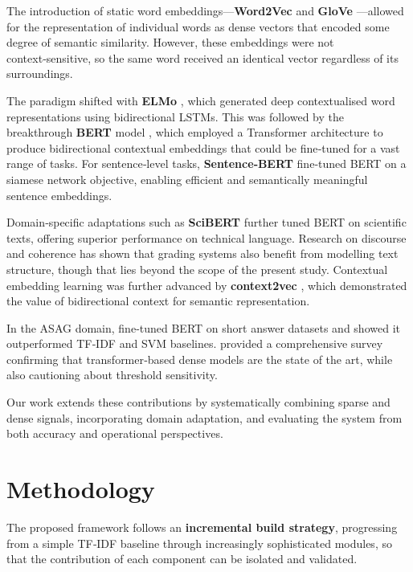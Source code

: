\documentclass[11pt,a4paper]{article}
\begin{document}
The introduction of static word embeddings---\textbf{Word2Vec} \cite{mikolov2013efficient} and \textbf{GloVe} \cite{pennington2014glove}---allowed for the representation of individual words as dense vectors that encoded some degree of semantic similarity. However, these embeddings were not context‑sensitive, so the same word received an identical vector regardless of its surroundings.

The paradigm shifted with \textbf{ELMo} \cite{peters2018deep}, which generated deep contextualised word representations using bidirectional LSTMs. This was followed by the breakthrough \textbf{BERT} model \cite{devlin2019bert}, which employed a Transformer architecture to produce bidirectional contextual embeddings that could be fine‑tuned for a vast range of tasks. For sentence‑level tasks, \textbf{Sentence‑BERT} \cite{reimers2019sentence} fine‑tuned BERT on a siamese network objective, enabling efficient and semantically meaningful sentence embeddings.

Domain‑specific adaptations such as \textbf{SciBERT} \cite{beltagy2019scibert} further tuned BERT on scientific texts, offering superior performance on technical language. Research on discourse and coherence \cite{somasundaran2014lexical, feng2014linear} has shown that grading systems also benefit from modelling text structure, though that lies beyond the scope of the present study. Contextual embedding learning was further advanced by \textbf{context2vec} \cite{melamud2016context2vec}, which demonstrated the value of bidirectional context for semantic representation.

In the ASAG domain, \cite{rodriguez2019bert} fine‑tuned BERT on short answer datasets and showed it outperformed TF‑IDF and SVM baselines. \cite{zafar2021survey} provided a comprehensive survey confirming that transformer‑based dense models are the state of the art, while also cautioning about threshold sensitivity.

Our work extends these contributions by systematically combining sparse and dense signals, incorporating domain adaptation, and evaluating the system from both accuracy and operational perspectives.

\section{Methodology}
\label{sec:methodology}
The proposed framework follows an \textbf{incremental build strategy}, progressing from a simple TF‑IDF baseline through increasingly sophisticated modules, so that the contribution of each component can be isolated and validated.
\end{document}
